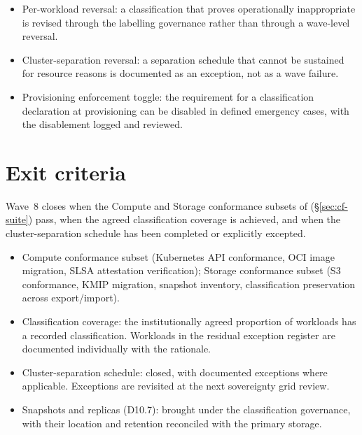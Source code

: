 \begin{itemize}[leftmargin=1.5em,nosep]
  \item Per-workload reversal: a classification that proves
    operationally inappropriate is revised through the labelling
    governance rather than through a wave-level reversal.
  \item Cluster-separation reversal: a separation schedule that
    cannot be sustained for resource reasons is documented as an
    exception, not as a wave failure.
  \item Provisioning enforcement toggle: the requirement for a
    classification declaration at provisioning can be disabled
    in defined emergency cases, with the disablement logged and
    reviewed.
\end{itemize}

\section{Exit criteria}
\label{sec:w8-exit}

Wave~8 closes when the Compute and Storage conformance subsets
of  (\S\ref{sec:cf-suite}) pass, when
the agreed classification coverage is achieved, and when the
cluster-separation schedule has been completed or explicitly
excepted.

\begin{itemize}[leftmargin=1.5em,nosep]
  \item Compute conformance subset (Kubernetes API conformance,
    OCI image migration, SLSA attestation verification);
    Storage conformance subset (S3 conformance, KMIP migration,
    snapshot inventory, classification preservation across
    export/import).
  \item Classification coverage: the institutionally agreed
    proportion of workloads has a recorded classification.
    Workloads in the residual exception register are documented
    individually with the rationale.
  \item Cluster-separation schedule: closed, with documented
    exceptions where applicable. Exceptions are revisited at
    the next sovereignty grid review.
  \item Snapshots and replicas (D10.7): brought under the
    classification governance, with their location and
    retention reconciled with the primary storage.
\end{itemize}

